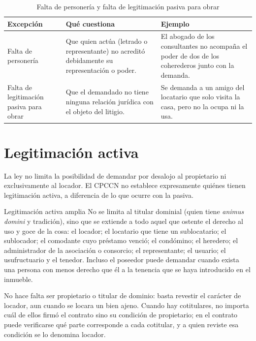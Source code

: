 \documentclass[12pt,oneside]{book}
\begin{document}
\begin{table}[H]
\centering
\caption{Falta de personería y falta de legitimación pasiva para obrar}
\begin{tabularx}{\textwidth}{>{\raggedright\arraybackslash}p{} >{\raggedright\arraybackslash}p{} X}
\toprule
\textbf{Excepción} & \textbf{Qué cuestiona} & \textbf{Ejemplo} \\
\midrule
Falta de personería & Que quien actúa (letrado o representante) no acreditó debidamente su representación o poder. & El abogado de los consultantes no acompaña el poder de dos de los coherederos junto con la demanda. \\
Falta de legitimación pasiva para obrar & Que el demandado no tiene ninguna relación jurídica con el objeto del litigio. & Se demanda a un amigo del locatario que solo visita la casa, pero no la ocupa ni la usa. \\
\bottomrule
\end{tabularx}
\end{table}

\section{Legitimación activa}\label{sec:leg-activa}

La ley no limita la posibilidad de demandar por desalojo al propietario ni exclusivamente al locador. El CPCCN no establece expresamente quiénes tienen legitimación activa, a diferencia de lo que ocurre con la pasiva.

\begin{definition}{Legitimación activa amplia}
No se limita al titular dominial (quien tiene \textit{animus domini} y tradición), sino que se extiende a todo aquel que ostente el derecho al uso y goce de la cosa: el locador; el locatario que tiene un sublocatario; el sublocador; el comodante cuyo préstamo venció; el condómino; el heredero; el administrador de la asociación o consorcio; el representante; el usuario; el usufructuario y el tenedor. Incluso el poseedor puede demandar cuando exista una persona con menos derecho que él a la tenencia que se haya introducido en el inmueble.
\end{definition}

No hace falta ser propietario o titular de dominio: basta revestir el carácter de locador, aun cuando se locara un bien ajeno. Cuando hay cotitulares, no importa cuál de ellos firmó el contrato sino su condición de propietario; en el contrato puede verificarse qué parte corresponde a cada cotitular, y a quien reviste esa condición se lo denomina locador.
\end{document}
